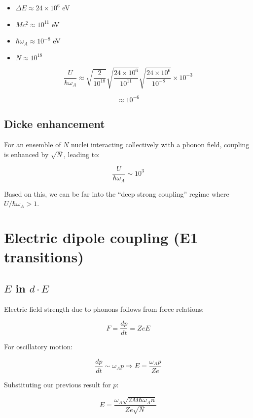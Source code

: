 \documentclass[
]{article}
\renewcommand{\[}{\begin{equation}}
\renewcommand{\]}{\end{equation}}
\providecommand{\tightlist}{%
  \setlength{\itemsep}{0pt}\setlength{\parskip}{0pt}}
\begin{document}
\begin{itemize}
\tightlist
\item
  \(\Delta E \approx 24 \times 10^{6}\) eV\\
\item
  \(M c^2 \approx 10^{11}\) eV\\
\item
  \(\hbar \omega_A \approx 10^{-8}\) eV\\
\item
  \(N \approx 10^{18}\)
\end{itemize}

\[
\frac{U}{\hbar \omega_A} \approx \sqrt{\frac{2}{10^{18}}} \sqrt{\frac{24 \times 10^6}{10^{11}}} \sqrt{\frac{24 \times 10^6}{10^{-8}}} \times 10^{-3}
\]

\[
\approx 10^{-6}
\]

\subsection{Dicke enhancement}\label{dicke-enhancement}

For an ensemble of \(N\) nuclei interacting collectively with a phonon
field, coupling is enhanced by \(\sqrt{N}\), leading to:

\[
\frac{U}{\hbar \omega_A} \sim 10^{3}
\]

Based on this, we can be far into the ``deep strong coupling'' regime
where \(U/\hbar \omega_A > 1\).

\section{Electric dipole coupling (E1
transitions)}\label{electric-dipole-coupling-e1-transitions}

\subsection{\texorpdfstring{\(E\) in
\(d \cdot E\)}{E in d \textbackslash cdot E}}\label{e-in-d-cdot-e}

Electric field strength due to phonons follows from force relations:

\[
F = \frac{dp}{dt} = ZeE
\]

For oscillatory motion:

\[
\frac{dp}{dt} \sim \omega_A p \Rightarrow E = \frac{\omega_A p}{Ze}
\]

Substituting our previous result for \(p\):

\[
E = \frac{\omega_A \sqrt{2M \hbar \omega_A n}}{Ze \sqrt{N}} \label{eq:E}
\]
\end{document}
